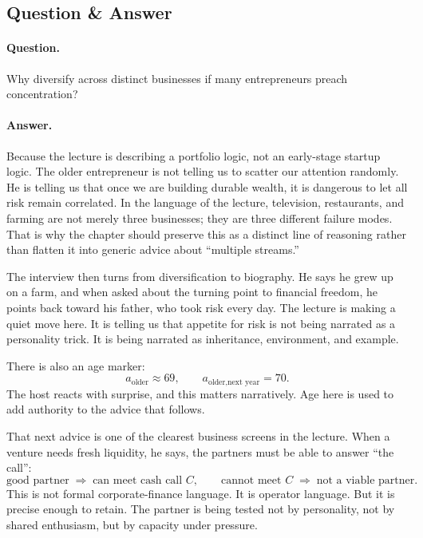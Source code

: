 \subsection{Question \& Answer}

\paragraph{Question.} Why diversify across distinct businesses if many entrepreneurs preach concentration?

\paragraph{Answer.} Because the lecture is describing a portfolio logic, not an early-stage startup logic. The older entrepreneur is not telling us to scatter our attention randomly. He is telling us that once we are building durable wealth, it is dangerous to let all risk remain correlated. In the language of the lecture, television, restaurants, and farming are not merely three businesses; they are three different failure modes. That is why the chapter should preserve this as a distinct line of reasoning rather than flatten it into generic advice about ``multiple streams.''

The interview then turns from diversification to biography. He says he grew up on a farm, and when asked about the turning point to financial freedom, he points back toward his father, who took risk every day. The lecture is making a quiet move here. It is telling us that appetite for risk is not being narrated as a personality trick. It is being narrated as inheritance, environment, and example.

There is also an age marker:
\begin{equation}
a_{\text{older}} \approx 69,\qquad
a_{\text{older,next year}} = 70.
\end{equation}
The host reacts with surprise, and this matters narratively. Age here is used to add authority to the advice that follows.

That next advice is one of the clearest business screens in the lecture. When a venture needs fresh liquidity, he says, the partners must be able to answer ``the call'':
\begin{equation}
\text{good partner} \;\Rightarrow\; \text{can meet cash call } C,
\qquad
\text{cannot meet } C \;\Rightarrow\; \text{not a viable partner}.
\end{equation}
This is not formal corporate-finance language. It is operator language. But it is precise enough to retain. The partner is being tested not by personality, not by shared enthusiasm, but by capacity under pressure.

